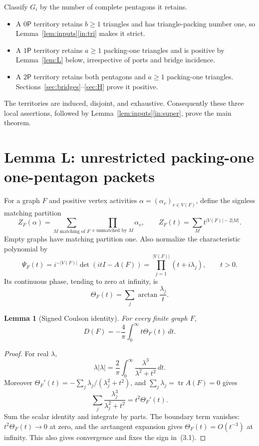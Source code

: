 \documentclass[11pt]{article}
\newtheorem{lemma}[theorem]{Lemma}
\theoremstyle{remark}
\newcommand{\D}{D}
\newcommand{\tr}{\operatorname{tr}}
\newcommand{\Pp}{\mathsf P}
\begin{document}
Classify $G_i$ by the number of complete pentagons it retains.
\begin{itemize}
\item A $0\Pp$ territory retains $b\geq1$ triangles and has triangle-packing
number one, so Lemma~\ref{lem:inputs}\ref{in:tri} makes it strict.
\item A $1\Pp$ territory retains $a\geq1$ packing-one triangles and is
positive by Lemma~\ref{lem:L} below, irrespective of ports and bridge
incidence.
\item A $2\Pp$ territory retains both pentagons and $a\geq1$ packing-one
triangles.  Sections~\ref{sec:bridges}--\ref{sec:H} prove it positive.
\end{itemize}
The territories are induced, disjoint, and exhaustive.  Consequently these
three local assertions, followed by Lemma~\ref{lem:inputs}\ref{in:super}, prove
the main theorem.

\section{Lemma L: unrestricted packing-one one-pentagon packets}

For a graph $F$ and positive vertex activities
$\alpha=(\alpha_v)_{v\in V(F)}$, define the signless matching partition
\[
 Z_F(\alpha)=\sum_{M\text{ matching of }F}
       \prod_{v\text{ unmatched by }M}\alpha_v,
 \qquad
 Z_F(t)=\sum_M t^{|V(F)|-2|M|}.
\]
Empty graphs have matching partition one.  Also normalize the characteristic
polynomial by
\[
 \Psi_F(t)=i^{-|V(F)|}\det(itI-A(F))
           =\prod_{j=1}^{|V(F)|}(t+i\lambda_j),\qquad t>0.
\]
Its continuous phase, tending to zero at infinity, is
\[
 \Theta_F(t)=\sum_j\arctan\frac{\lambda_j}{t}.
\]

\begin{lemma}[Signed Coulson identity]\label{lem:coulson}
For every finite graph $F$,
\[
 \D(F)=-\frac4\pi\int_0^\infty t\Theta_F(t)\,dt.          \tag{3.1}
\]
\end{lemma}

\begin{proof}
For real $\lambda$,
\[
 \lambda|\lambda|=\frac2\pi\int_0^\infty
       \frac{\lambda^3}{\lambda^2+t^2}\,dt.
\]
Moreover $\Theta_F'(t)=-\sum_j\lambda_j/(\lambda_j^2+t^2)$, and
$\sum_j\lambda_j=\tr A(F)=0$ gives
\[
 \sum_j\frac{\lambda_j^3}{\lambda_j^2+t^2}
 =t^2\Theta_F'(t).
\]
Sum the scalar identity and integrate by parts.  The boundary term vanishes:
$t^2\Theta_F(t)\to0$ at zero, and the arctangent expansion gives
$\Theta_F(t)=O(t^{-3})$ at infinity.  This also gives convergence and fixes
the sign in~(3.1).
\end{proof}
\end{document}
